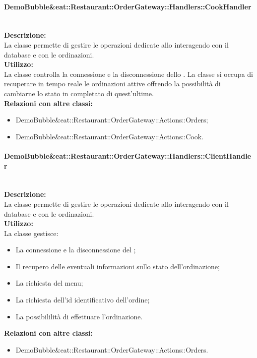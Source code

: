 \paragraph{Demo\-Bubble\&eat\-::Restaurant\-::Order\-Gateway\-::Handlers\-::Cook\-Handler}\label{eat-handler}\mbox{}\\
\textbf{Descrizione:}\\
La classe permette di gestire le operazioni dedicate allo \Chef{} interagendo con il database e con le ordinazioni.\\
\textbf{Utilizzo:}\\
La classe controlla la connessione e la disconnessione dello \Chef{}. La classe si occupa di recuperare in tempo reale le ordinazioni attive offrendo la possibilità di cambiarne lo stato in completato di quest'ultime.\\
\textbf{Relazioni con altre classi:}\\
\begin{itemize}
	\item {Demo\-Bubble\&eat\-::Restaurant\-::Order\-Gateway\-::Actions\-::Orders};
	\item {Demo\-Bubble\&eat\-::Restaurant\-::Order\-Gateway\-::Actions\-::Cook}.
\end{itemize}

\paragraph{Demo\-Bubble\&eat\-::Restaurant\-::Order\-Gateway\-::Handlers\-::Client\-Handler}\label{eat-handler}\mbox{}\\
\textbf{Descrizione:}\\
La classe permette di gestire le operazioni dedicate allo \Customer{} interagendo con il database e con le ordinazioni.\\
\textbf{Utilizzo:}\\
La classe gestisce:
\begin{itemize}
	\item La connessione e la disconnessione del \Customer{};
	\item Il recupero delle eventuali informazioni sullo stato dell'ordinazione;
	\item La richiesta del menu;
	\item La richiesta dell'id identificativo dell'ordine;
	\item La possibililità di effettuare l'ordinazione.\\
\end{itemize}
\textbf{Relazioni con altre classi:}\\
\begin{itemize}
	\item {Demo\-Bubble\&eat\-::Restaurant\-::Order\-Gateway\-::Actions\-::Orders}.
\end{itemize}

